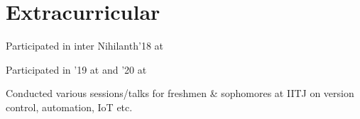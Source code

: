 \documentclass[]{deedy-resume-openfont}
\begin{document}
\begin{minipage}[t]{0.67\textwidth}
\section{Extracurricular} 
\begin{bulletedlist}
\item Participated in inter  Nihilanth'18 at 
\item Participated in  '19 at  and '20 at 
\item Conducted various sessions/talks for freshmen \& sophomores at IITJ on version control, automation, IoT etc.

\end{bulletedlist}

\end{minipage}
\end{document}
